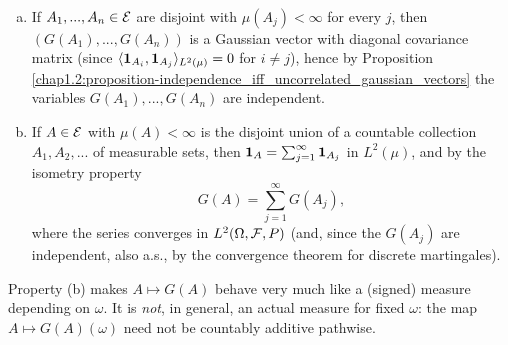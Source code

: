 \begin{properties} \label{chap1.4:properties-additivity_of_white_noise}
 \\
\begin{enumerate}[(a)]
    \item If $A_1,...,A_n \in \mathcal{E}$ are disjoint with $\mu(A_j)<\infty$ for every $j$, then $(G(A_1),...,G(A_n))$ is a Gaussian vector with diagonal covariance matrix (since $\langle \mathbf{1}_{A_i},\mathbf{1}_{A_j}\rangle_{L^2(\mu)}=0$ for $i \neq j$), hence by Proposition \ref{chap1.2:proposition-independence_iff_uncorrelated_gaussian_vectors} the variables $G(A_1),...,G(A_n)$ are independent.
    \item If $A \in \mathcal{E}$ with $\mu(A)<\infty$ is the disjoint union of a countable collection $A_1,A_2,...$ of measurable sets, then $\mathbf{1}_A=\sum_{j=1}^\infty \mathbf{1}_{A_j}$ in $L^2(\mu)$, and by the isometry property
    $$G(A)=\sum_{j=1}^\infty G(A_j),$$
    where the series converges in $L^2(\Omega,\mathcal{F},P)$ (and, since the $G(A_j)$ are independent, also a.s., by the convergence theorem for discrete martingales).
\end{enumerate}
\end{properties}
\begin{trap}
Property (b) makes $A \mapsto G(A)$ behave very much like a (signed) measure depending on $\omega$. It is \emph{not}, in general, an actual measure for fixed $\omega$: the map $A \mapsto G(A)(\omega)$ need not be countably additive pathwise.
\end{trap}

